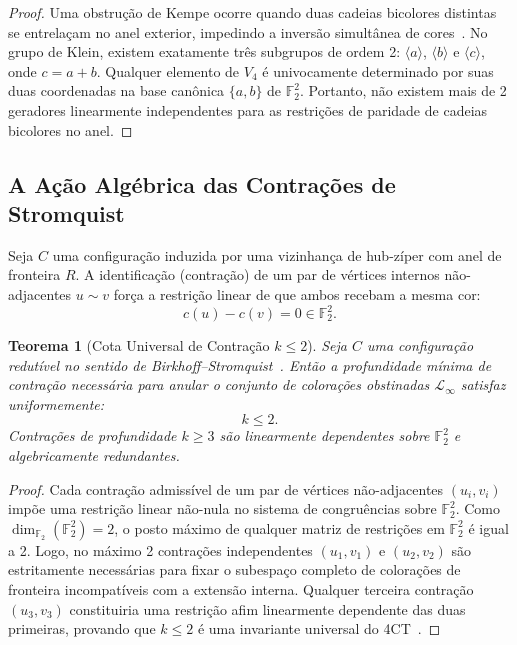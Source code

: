 \documentclass[11pt,a4paper]{article}
\theoremstyle{plain}
\newtheorem{theorem}{Teorema}[section]
\theoremstyle{definition}
\begin{document}
\begin{proof}
Uma obstrução de Kempe ocorre quando duas cadeias bicolores distintas se entrelaçam no anel exterior, impedindo a inversão simultânea de cores~\cite{heawood1890map}. No grupo de Klein, existem exatamente três subgrupos de ordem 2: $\langle a \rangle$, $\langle b \rangle$ e $\langle c \rangle$, onde $c = a + b$. 
Qualquer elemento de $V_4$ é univocamente determinado por suas duas coordenadas na base canônica $\{a, b\}$ de $\mathbb{F}_2^2$. Portanto, não existem mais de 2 geradores linearmente independentes para as restrições de paridade de cadeias bicolores no anel.
\end{proof}

\subsection{A Ação Algébrica das Contrações de Stromquist}

Seja $C$ uma configuração induzida por uma vizinhança de hub-zíper com anel de fronteira $R$. 
A identificação (contração) de um par de vértices internos não-adjacentes $u \sim v$ força a restrição linear de que ambos recebam a mesma cor:
\begin{equation}
c(u) - c(v) = 0 \in \mathbb{F}_2^2.
\end{equation}

\begin{theorem}[Cota Universal de Contração $k \le 2$]
Seja $C$ uma configuração redutível no sentido de Birkhoff--Stromquist~\cite{birkhoff1913reducibility, stromquist1975some}. Então a profundidade mínima de contração necessária para anular o conjunto de colorações obstinadas $\mathcal{L}_\infty$ satisfaz uniformemente:
\begin{equation}
k \le 2.
\end{equation}
Contrações de profundidade $k \ge 3$ são linearmente dependentes sobre $\mathbb{F}_2^2$ e algebricamente redundantes.
\end{theorem}

\begin{proof}
Cada contração admissível de um par de vértices não-adjacentes $(u_i, v_i)$ impõe uma restrição linear não-nula no sistema de congruências sobre $\mathbb{F}_2^2$. 
Como $\dim_{\mathbb{F}_2}(\mathbb{F}_2^2) = 2$, o posto máximo de qualquer matriz de restrições em $\mathbb{F}_2^2$ é igual a 2. 
Logo, no máximo 2 contrações independentes $(u_1, v_1)$ e $(u_2, v_2)$ são estritamente necessárias para fixar o subespaço completo de colorações de fronteira incompatíveis com a extensão interna. Qualquer terceira contração $(u_3, v_3)$ constituiria uma restrição afim linearmente dependente das duas primeiras, provando que $k \le 2$ é uma invariante universal do 4CT~\cite{stromquist1975some}.
\end{proof}
\end{document}
